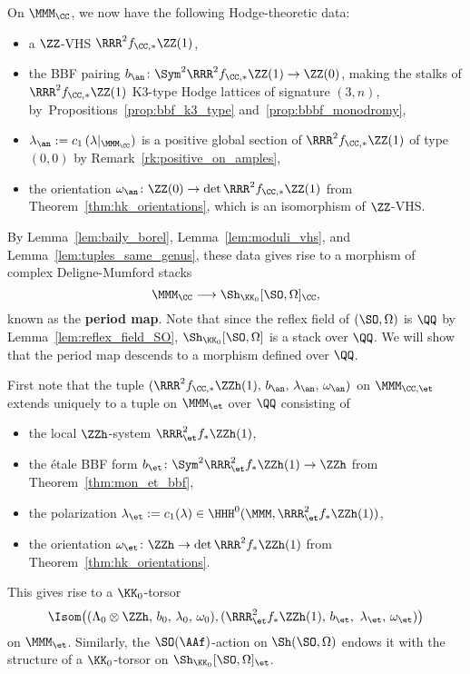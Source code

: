 On $\MMM_{\CC}$, we now have the following Hodge-theoretic data:
\begin{itemize}
\item a $\ZZ$-VHS $\RRR^2 f_{\CC,*} \ZZ(1)$,
\item the BBF pairing $b_{\an}\colon \Sym^2 \RRR^2 f_{\CC,*} \ZZ(1) \rightarrow \ZZ(0)$, making the stalks of $\RRR^2 f_{\CC,*} \ZZ(1)$ K3-type Hodge lattices of signature $(3,n)$, by~Propositions~\ref{prop:bbf_k3_type} and~\ref{prop:bbbf_monodromy},
\item $\lambda_{\an} := c_1\left(\lambda|_{\MMM_{\CC}}\right)$ is a positive global section of $\RRR^2 f_{\CC,*} \ZZ(1)$ of type $(0,0)$ by Remark~\ref{rk:positive_on_amples},
\item the orientation $\omega_{\an}\colon \ZZ(0) \rightarrow \det \RRR^2 f_{\CC,*} \ZZ(1)$ from Theorem~\ref{thm:hk_orientations}, which is an isomorphism of $\ZZ$-VHS.
\end{itemize}
By Lemma~\ref{lem:baily_borel}, Lemma~\ref{lem:moduli_vhs}, and Lemma~\ref{lem:tuples_same_genus}, these data gives rise to a morphism of complex Deligne-Mumford stacks
$$
\MMM_{\CC} \longrightarrow \Sh_{\KK_0}[\SO,\Omega]_{\CC},
$$
known as the {\bfseries period map}. Note that since the reflex field of $(\SO,\Omega)$ is $\QQ$ by Lemma~\ref{lem:reflex_field_SO}, $\Sh_{\KK_0}[\SO,\Omega]$ is a stack over $\QQ$. We will show that the period map descends to a morphism defined over $\QQ$.

First note that the tuple $(\RRR^2 f_{\CC,*} \ZZh(1),\, b_{\an},\, \lambda_{\an},\, \omega_{\an})$ on $\MMM_{\CC,\et}$ extends uniquely to a tuple on $\MMM_{\et}$ over $\QQ$ consisting of
\begin{itemize}
\item the local $\ZZh$-system $\RRR^2_{\et} f_* \ZZh(1)$,
\item the \'etale BBF form $b_{\et}\colon \Sym^2 \RRR^2_{\et} f_* \ZZh(1) \rightarrow \ZZh$ from Theorem~\ref{thm:mon_et_bbf},
\item the polarization $\lambda_{\et} := c_1(\lambda) \in \HHH^0(\MMM,\RRR^2_{\et} f_* \ZZh(1))$,
\item the orientation $\omega_{\et}\colon \ZZh \rightarrow \det \RRR^2 f_* \ZZh(1)$ from Theorem~\ref{thm:hk_orientations}.
\end{itemize}
This gives rise to a $\KK_0$-torsor
$$
\Isom\!\left((\Lambda_0 \otimes \ZZh,\, b_0,\, \lambda_0,\, \omega_0), (\RRR^2_{\et}f_* \ZZh(1),\, b_{\et},\,\, \lambda_{\et},\, \omega_{\et})\right)
$$
on $\MMM_{\et}$. Similarly, the $\SO(\AAf)$-action on $\Sh(\SO,\Omega)$ endows it with the structure of a $\KK_0$-torsor on $\Sh_{\KK_0}[\SO,\Omega]_{\et}$.

